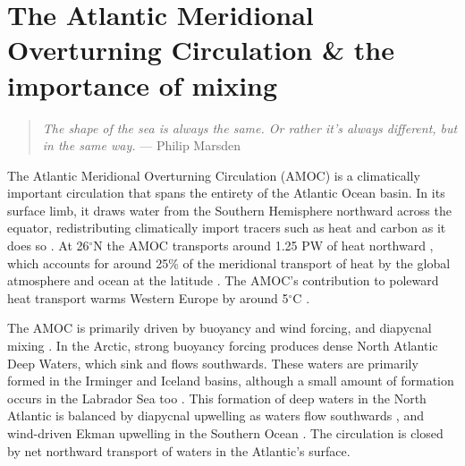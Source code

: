 \chapter{The Atlantic Meridional Overturning Circulation \& the importance of mixing}
\begin{quote}
\textit{The shape of the sea is always the same. Or rather it's always different, but in the same way.} --- Philip Marsden
\end{quote}

The Atlantic Meridional Overturning Circulation (AMOC) is a climatically important circulation that spans the entirety of the Atlantic Ocean basin. In its surface limb, it draws water from the Southern Hemisphere northward across the equator, redistributing climatically import tracers such as heat and carbon as it does so \citep{Buckley2015}. At 26$^\circ$N the AMOC transports around 1.25 PW of heat northward \citep{Bryden2020}, which accounts for around 25\% of the meridional transport of heat by the global atmosphere and ocean at the latitude \citep{Srokosz2012}. The AMOC's contribution to poleward heat transport warms Western Europe by around 5$^\circ$C \citep{Jackson2015}.

The AMOC is primarily driven by buoyancy and wind forcing, and diapycnal mixing \citep{Johnson2019}. In the Arctic, strong buoyancy forcing produces dense North Atlantic Deep Waters, which sink and flows southwards. These waters are primarily formed in the Irminger and Iceland basins, although a small amount of formation occurs in the Labrador Sea too \citep{Lozier2019}. This formation of deep waters in the North Atlantic is balanced by diapycnal upwelling as waters flow southwards \citep{Cimoli2022,Ferrari2016,Mashayek2017,McDougall2017}, and wind-driven Ekman upwelling in the Southern Ocean \citep{Gnanadesikan1999, Marshall2012}. The circulation is closed by net northward transport of waters in the Atlantic's surface.

